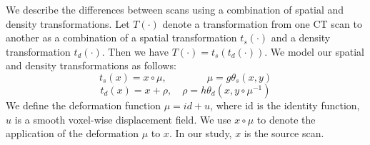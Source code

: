 \documentclass{article}
\begin{document}
We describe the differences between scans using a combination of spatial and density transformations. 
Let $T(\cdot)$ denote a transformation from one CT scan to another as a combination of a spatial transformation $t_s(\cdot)$ and a density transformation $t_d(\cdot)$. Then we have $T(\cdot)=t_s(t_d(\cdot))$. 
We model our spatial and density transformations as follows:
\begin{equation}
    t_s(x)=x\circ\mu,\qquad\qquad\mu=g\theta_s(x,y)
\end{equation}
\begin{equation}
    t_d(x)=x+\rho,\quad\rho=h\theta_d(x,y\circ\mu^{-1})
\end{equation}
We define the deformation function $\mu=id+u$, where id is the identity function, $u$ is a smooth voxel-wise displacement field. 
We use $x\circ\mu$ to denote the application of the deformation $\mu$ to $x$. In our study, $x$ is the source scan.
\end{document}
